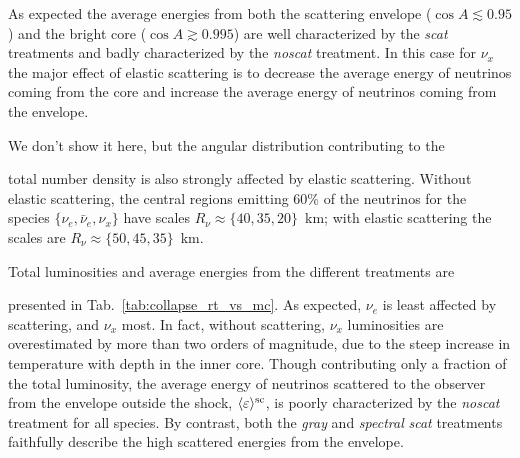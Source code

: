 \documentclass[aps,floatfix,prd,superscriptaddress,twocolumn]{revtex4-1}
\newcommand{\todo}[1]{\marginpar{\tiny{\textcolor{red}{#1}}}}
\renewcommand\todo[1]{} %
\begin{document}
As expected the average energies from both
the scattering envelope ($\cos A \lesssim 0.95$) and
the bright core ($\cos A\gtrsim 0.995 $)
are well characterized by the \emph{scat} treatments
and badly characterized by the \emph{noscat} treatment.
In this case for $\nu_x$ the major effect of elastic scattering
is to decrease the average energy of neutrinos coming from the core
and increase the average energy of neutrinos coming from the envelope.

We don't show it here, but the angular distribution contributing to the
\todo{do show it}
total number density is also strongly affected by elastic scattering.
Without elastic scattering, the central regions emitting 60\%
of the neutrinos for the species $\{\nu_e,\bar{\nu}_e,\nu_x\}$
have scales $R_\nu\approx\{40,35,20\}$~km;
with elastic scattering the scales are
$R_\nu\approx\{50,45,35\}$~km.

Total luminosities and average energies from the different treatments are
\todo{update MC results 02->03}
presented in Tab.~\ref{tab:collapse_rt_vs_mc}.
As expected, $\nu_e$ is least affected by scattering, and $\nu_x$ most.
In fact, without scattering, $\nu_x$ luminosities are overestimated by more than
two orders of magnitude, due to the steep increase in temperature with depth
in the inner core.
Though contributing only a fraction of the total luminosity,
the average energy of neutrinos scattered to the observer from the envelope
outside the shock, $\langle\varepsilon\rangle^{\rm sc}$,
is poorly characterized by the \emph{noscat} treatment for all species.
By contrast, both the \emph{gray} and \emph{spectral} \emph{scat} treatments
faithfully describe the high scattered energies from the envelope.
\end{document}
